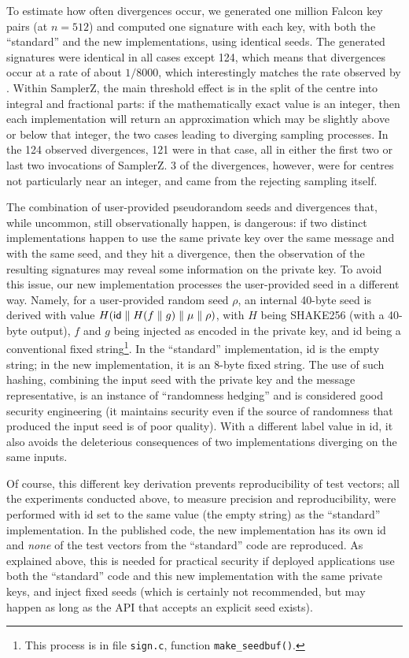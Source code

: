 \documentclass{llncs}
\begin{document}
To estimate how often divergences occur, we generated one million Falcon
key pairs (at $n = 512$) and computed one signature with each key, with
both the ``standard'' and the new implementations, using identical
seeds. The generated signatures were identical in all cases except 124,
which means that divergences occur at a rate of about $1/8000$, which
interestingly matches the rate observed by \cite{AlmFouLacPre2026}.
Within \textsf{SamplerZ}, the main threshold effect is in the split of
the centre into integral and fractional parts: if the mathematically
exact value is an integer, then each implementation will return an
approximation which may be slightly above or below that integer, the two
cases leading to diverging sampling processes. In the 124 observed
divergences, 121 were in that case, all in either the first two or last
two invocations of \textsf{SamplerZ}. 3 of the divergences, however,
were for centres not particularly near an integer, and came from the
rejecting sampling itself.

The combination of user-provided pseudorandom seeds and divergences
that, while uncommon, still observationally happen, is dangerous: if two
distinct implementations happen to use the same private key over the
same message and with the same seed, and they hit a divergence, then the
observation of the resulting signatures may reveal some information on
the private key. To avoid this issue, our new implementation processes
the user-provided seed in a different way. Namely, for a user-provided
random seed $\rho$, an internal 40-byte seed is derived with value
$H(\text{\textsf{id}} \parallel H(f \parallel g) \parallel \mu \parallel
\rho)$, with $H$ being SHAKE256 (with a 40-byte output), $f$ and $g$
being injected as encoded in the private key, and \textsf{id} being a
conventional fixed string\footnote{This process is in file
\texttt{sign.c}, function \texttt{make\_seedbuf()}.}. In the
``standard'' implementation, \textsf{id} is the empty string; in the new
implementation, it is an 8-byte fixed string. The use of such hashing,
combining the input seed with the private key and the message
representative, is an instance of ``randomness hedging'' and is
considered good security engineering (it maintains security even if the
source of randomness that produced the input seed is of poor quality).
With a different label value in \textsf{id}, it also avoids the
deleterious consequences of two implementations diverging on the same
inputs.

Of course, this different key derivation prevents reproducibility of
test vectors; all the experiments conducted above, to measure precision
and reproducibility, were performed with \textsf{id} set to the same
value (the empty string) as the ``standard'' implementation. In the
published code, the new implementation has its own \textsf{id} and
\emph{none} of the test vectors from the ``standard'' code are
reproduced. As explained above, this is needed for practical security if
deployed applications use both the ``standard'' code and this new
implementation with the same private keys, and inject fixed seeds (which
is certainly not recommended, but may happen as long as the API that
accepts an explicit seed exists).
\end{document}
